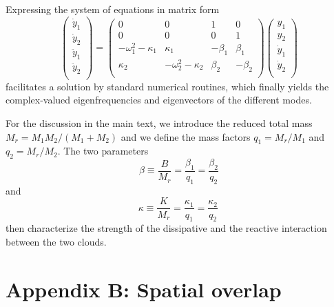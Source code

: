 Expressing the system of equations in matrix form
\begin{equation}
	\left( \begin{array}{cccc}
		\dot{y}_1 \\
		\dot{y}_2 \\
		\ddot{y}_1 \\
		\ddot{y}_2 \\
	\end{array}\right)
	=
	\left( \begin{array}{cccc}
		0 & 0 & 1 & 0 \\
		0 & 0 & 0 & 1 \\
		-\omega_1^2 - \kappa_1 & \kappa_1 & -\beta_1 &\beta_1 \\
		\kappa_2          & -\omega_2^2-\kappa_2 & \beta_2 & -\beta_2 \\
	\end{array}\right)
	\left( \begin{array}{cccc}
		{y}_1 \\
		{y}_2 \\
		\dot{y}_1 \\
		\dot{y}_2 \\
	\end{array}\right)
\end{equation}
facilitates a solution by standard numerical routines, which finally yields the complex-valued eigenfrequencies and eigenvectors of the different modes.

For the discussion in the main text, we introduce the reduced total mass $M_r = M_1 M_2 / (M_1 +M_2)$ 
and we define the mass factors $q_1 = M_r/M_1$ and $q_2 = M_r/M_2$. %
The two parameters
\begin{equation}
	\beta \equiv \frac{B}{M_r} = \frac{\beta_1}{q_1} = \frac{\beta_2}{q_2}
\end{equation}
and
\begin{equation}
	\kappa \equiv \frac{K}{M_r} = \frac{\kappa_1}{q_1} = \frac{\kappa_2}{q_2} \, 
\end{equation}
then characterize the strength of the dissipative and the reactive interaction between the two clouds.



\section{Appendix B: Spatial overlap}
\label{app:overlap}

